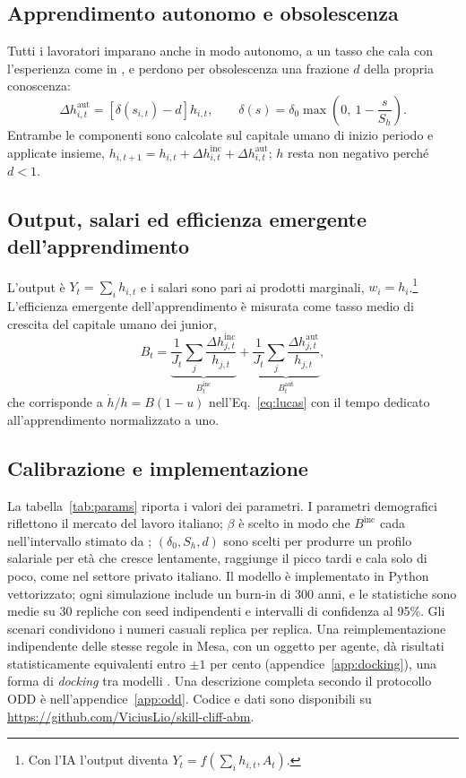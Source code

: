 \documentclass[preprint,12pt,authoryear]{elsarticle}
\begin{document}
\subsection{Apprendimento autonomo e obsolescenza}

Tutti i lavoratori imparano anche in modo autonomo, a un tasso che cala con l'esperienza come in \citet{BenPorath1967}, e perdono per obsolescenza una frazione $d$ della propria conoscenza:
\begin{equation}\label{eq:aut}
\Delta h^{\mathrm{aut}}_{i,t} = \left[\delta(s_{i,t})-d\right] h_{i,t}, \qquad \delta(s) = \delta_0 \max\!\left(0,\ 1-\frac{s}{S_h}\right).
\end{equation}
Entrambe le componenti sono calcolate sul capitale umano di inizio periodo e applicate insieme, $h_{i,t+1}=h_{i,t}+\Delta h^{\mathrm{inc}}_{i,t}+\Delta h^{\mathrm{aut}}_{i,t}$; $h$ resta non negativo perché $d<1$.

\subsection{Output, salari ed efficienza emergente dell'apprendimento}

L'output è $Y_t=\sum_i h_{i,t}$ e i salari sono pari ai prodotti marginali, $w_i = h_i$.\footnote{Con l'IA l'output diventa $Y_t = f(\sum_i h_{i,t}, A_t)$.} L'efficienza emergente dell'apprendimento è misurata come tasso medio di crescita del capitale umano dei junior,
\begin{equation}\label{eq:B}
B_t = \underbrace{\frac{1}{J_t}\sum_{j}\frac{\Delta h^{\mathrm{inc}}_{j,t}}{h_{j,t}}}_{B^{\mathrm{inc}}_t} + \underbrace{\frac{1}{J_t}\sum_{j}\frac{\Delta h^{\mathrm{aut}}_{j,t}}{h_{j,t}}}_{B^{\mathrm{aut}}_t},
\end{equation}
che corrisponde a $\dot h/h = B(1-u)$ nell'Eq.~\eqref{eq:lucas} con il tempo dedicato all'apprendimento normalizzato a uno.

\subsection{Calibrazione e implementazione}

La tabella~\ref{tab:params} riporta i valori dei parametri. I parametri demografici riflettono il mercato del lavoro italiano; $\beta$ è scelto in modo che $B^{\mathrm{inc}}$ cada nell'intervallo stimato da \citet{Jarosch2021}; $(\delta_0,S_h,d)$ sono scelti per produrre un profilo salariale per età che cresce lentamente, raggiunge il picco tardi e cala solo di poco, come nel settore privato italiano. Il modello è implementato in Python vettorizzato; ogni simulazione include un burn-in di 300 anni, e le statistiche sono medie su 30 repliche con seed indipendenti e intervalli di confidenza al 95\%. Gli scenari condividono i numeri casuali replica per replica. Una reimplementazione indipendente delle stesse regole in Mesa, con un oggetto per agente, dà risultati statisticamente equivalenti entro $\pm1$ per cento (appendice~\ref{app:docking}), una forma di \emph{docking} tra modelli \citep{Axtell1996}. Una descrizione completa secondo il protocollo ODD è nell'appendice~\ref{app:odd}. Codice e dati sono disponibili su \url{https://github.com/ViciusLio/skill-cliff-abm}.
\end{document}
